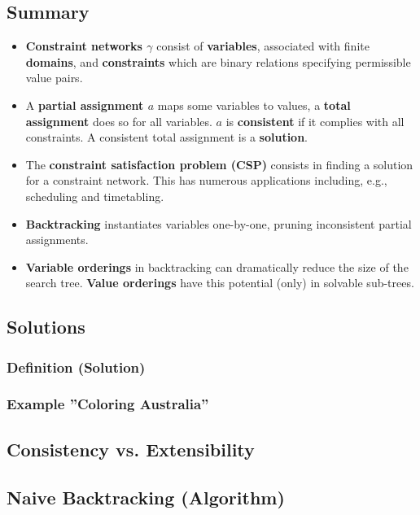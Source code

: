 \documentclass[conference, a4paper]{styles/acmsiggraph}
\begin{document}
    \subsection{Summary}
        \begin{itemize}
            \item \textbf{Constraint networks $\gamma$} consist of \textbf{variables}, associated with finite \textbf{domains}, and \textbf{constraints} which are binary relations specifying permissible value pairs.
            \item A \textbf{partial assignment $a$} maps some variables to values, a \textbf{total assignment} does so for all variables. 
            $a$ is \textbf{consistent} if it complies with all constraints.
            A consistent total assignment is a \textbf{solution}.
            \item The \textbf{constraint satisfaction problem (CSP)} consists in finding a solution for a constraint network.
            This has numerous applications including, e.g., scheduling and timetabling.
            \item \textbf{Backtracking} instantiates variables one-by-one, pruning inconsistent partial assignments.
            \item \textbf{Variable orderings} in backtracking can dramatically reduce the size of the search tree. 
            \textbf{Value orderings} have this potential (only) in solvable sub-trees.
        \end{itemize}
    
    \subsection{Solutions}
        \subsubsection{Definition (Solution)}
        \subsubsection{Example ''Coloring Australia''}
    \subsection{Consistency vs. Extensibility}
    \subsection{Naive Backtracking (Algorithm)}
\end{document}
